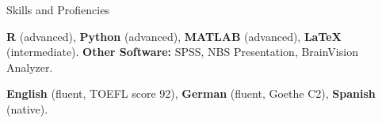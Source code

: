 \begin{rubric}{Skills and Profiencies}


\entry*[Programming:] 
\textbf{R} (advanced), \textbf{Python} (advanced), \textbf{MATLAB} (advanced), \textbf{LaTeX} (intermediate).
\newline \textbf{Other Software:} SPSS, NBS Presentation, BrainVision Analyzer.

\entry*[Language:] 
\textbf{English} (fluent, TOEFL score 92), \textbf{German} (fluent, Goethe C2), \textbf{Spanish} (native).

\end{rubric}
